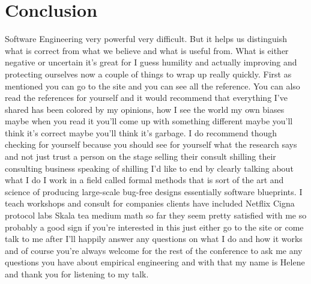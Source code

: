 \documentclass[14pt]{extreport}
\begin{document}
\chapter{Conclusion}
Software Engineering very powerful very difficult.
But it helps us distinguish what is correct from what we believe and what is useful from.
What is either negative or uncertain it's great for I guess humility and actually improving and protecting ourselves now a couple of things to wrap up really quickly.
First as mentioned you can go to the site and you can see all the reference.
You can also read the references for yourself and it would recommend that everything I've shared
has been colored by my opinions, how I see the world my own biases maybe when
you read it you'll come up with
something different maybe you'll think
it's correct maybe you'll think it's garbage.
I do recommend though checking for yourself because you should see for yourself what the research says and not
just trust a person on the stage selling their consult shilling their consulting business speaking of shilling I'd like
to end by clearly talking about what I
do I work in a field called formal
methods that is sort of the art and
science of producing large-scale
bug-free designs essentially software blueprints.
I teach workshops and consult for companies
clients have included Netflix Cigna
protocol labs Skala tea medium math so
far they seem pretty satisfied with me
so probably a good sign if you're
interested in this just either go to the
site or come talk to me after I'll
happily answer any questions on what I
do and how it works and of course you're
always welcome for the rest of the
conference to ask me any questions you
have about empirical engineering and
with that my name is Helene and thank
you for listening to my talk.
\end{document}
